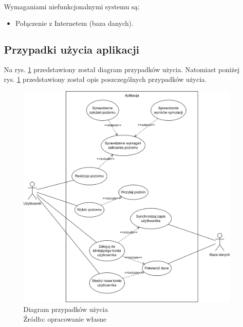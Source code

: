 \documentclass[12pt, a4paper]{article} %
\begin{document}
\noindent
Wymaganiami niefunkcjonalnymi systemu są:
\begin{itemize}[nosep]
	\item Połączenie z Internetem (baza danych).
\end{itemize}

\subsection{Przypadki użycia aplikacji}
Na rys. \ref{rys:diagram-przypadków-użycia}  przedstawiony został diagram przypadków użycia. Natomiast poniżej rys. \ref{rys:diagram-przypadków-użycia} przedstawiony został opis poszczególnych przypadków użycia.

\begin{figure}[h]
	\centering
	\includegraphics[width=15cm]{images/plan-use_case_diagram.png}
	\caption{Diagram przypadków użycia \\ Źródło: opracowanie własne}
	\label{rys:diagram-przypadków-użycia} %
\end{figure}
\end{document}
